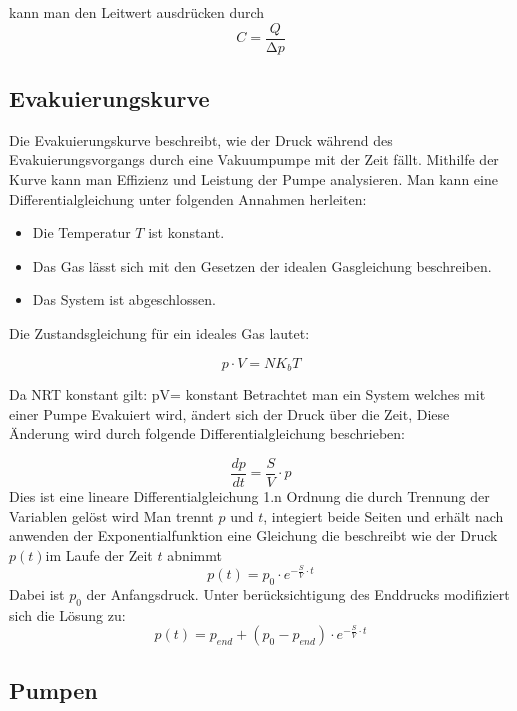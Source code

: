 kann man den Leitwert ausdrücken durch
\begin{equation}
    C=\frac{Q}{\increment p}
\end{equation} 


\subsection{Evakuierungskurve}
Die Evakuierungskurve beschreibt, wie der Druck während des Evakuierungsvorgangs durch eine Vakuumpumpe 
mit der Zeit fällt. Mithilfe der Kurve kann man Effizienz und Leistung der Pumpe analysieren.
Man kann eine Differentialgleichung unter folgenden Annahmen herleiten:
\begin{itemize}
\item Die Temperatur \(T \) ist konstant. 
\item Das Gas lässt sich mit den Gesetzen der idealen Gasgleichung beschreiben.
\item Das System ist abgeschlossen.
\end{itemize}

Die Zustandsgleichung für ein ideales Gas lautet:

\begin{equation}
    p \cdot V=NK_bT 
\end{equation}

Da N\cdot R\cdot T konstant gilt:  p\cdot V= konstant
Betrachtet man ein System welches mit einer Pumpe Evakuiert wird, ändert sich der Druck über die Zeit, 
Diese Änderung wird durch folgende Differentialgleichung beschrieben:

\begin{equation}
    \frac{dp}{dt}=\frac{S}{V}\cdot p
\end{equation}
Dies ist eine lineare Differentialgleichung 1.n Ordnung die durch Trennung der Variablen gelöst wird
Man trennt \(p \) und \(t \), integiert beide Seiten und erhält nach anwenden der Exponentialfunktion eine
Gleichung die beschreibt wie der Druck \(p(t)\)im Laufe der Zeit \(t \) abnimmt
\begin{equation}
p(t)=p_0\cdot e^{-\frac{S}{V}\cdot t}
\end{equation}
Dabei ist \(p_0\) der Anfangsdruck. Unter berücksichtigung des Enddrucks modifiziert sich die Lösung zu:
\begin{equation}
    p(t)=p_{end}+(p_0-p_{end})\cdot e^{-\frac{S}{V}\cdot t}
\end{equation}


\subsection{Pumpen}
